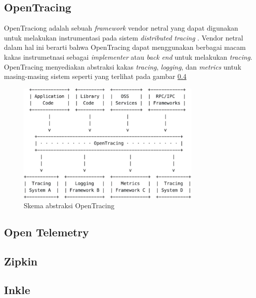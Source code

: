 \subsection{OpenTracing}

OpenTraciong adalah sebuah \textit{framework} vendor netral yang dapat digunakan untuk melakukan instrumentasi pada sistem \textit{distributed tracing} \citep{opentracing}. Vendor netral dalam hal ini berarti bahwa OpenTracing dapat menggunakan berbagai macam kakas instrumetnasi sebagai \textit{implementer} atau \textit{back end} untuk melakukan \textit{tracing}. OpenTracing menyediakan abstraksi kakas \textit{tracing}, \textit{logging}, dan \textit{metrics} untuk masing-masing sistem seperti yang terlihat pada gambar \ref{}
\begin{figure}[htb]
	\centering
	\includegraphics[width=0.8\textwidth]{resources/ch2/ch2-opentracing.png}
	\caption{Skema abstraksi OpenTracing \citep{opentracing}}
	\label{ch2-opentracing-1}
\end{figure}


\subsection{Open Telemetry}

\subsection{Zipkin}

\subsection{Inkle}

